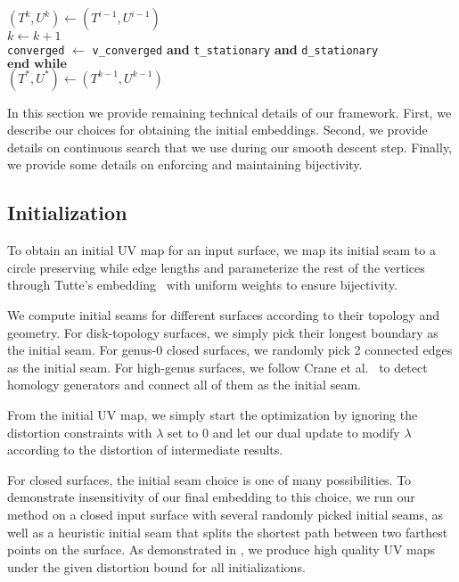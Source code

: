\begin{algorithm}[h!]
\hspace{10pt}  $(T^{k},U^{k}) \leftarrow (T^{i-1},U^{i-1})$ \\

\hspace{10pt} $k \leftarrow k + 1$ \\

\hspace{10pt} \texttt{converged} $\leftarrow$ \texttt{v\_converged} \textbf{and}   \texttt{t\_stationary}  \textbf{and} \texttt{d\_stationary} \\

 $\textbf{end while}$ \\
 
 $(T^{*},U^{*}) \leftarrow (T^{k-1},U^{k-1})$

\end{algorithm}


In this section we provide remaining technical details of our framework. First, we describe our choices for obtaining the initial embeddings. Second, we provide details on continuous search that we use during our smooth descent step. Finally, we provide some details on enforcing and maintaining bijectivity. 

\subsection{Initialization}
To obtain an initial UV map for an input surface, we map its initial seam to a circle preserving while edge lengths and parameterize the rest of the vertices through Tutte's embedding~ with uniform weights to ensure bijectivity.

We compute initial seams for different surfaces according to their topology and geometry. For disk-topology surfaces, we simply pick their longest boundary as the initial seam. For genus-0 closed surfaces, we randomly pick 2 connected edges as the initial seam. For high-genus surfaces, we follow Crane et al.~ to detect homology generators and connect all of them as the initial seam.

From the initial UV map, we simply start the optimization by ignoring the distortion constraints with $\lambda$ set to $0$ and let our dual update to modify $\lambda$ according to the distortion of intermediate results.

For closed surfaces, the initial seam choice is one of many possibilities. To demonstrate insensitivity of our final embedding to this choice, %
we run our method on a closed input surface with several randomly picked initial seams, as well as a heuristic initial seam that splits the shortest path between two farthest points on the surface. As demonstrated in , we produce high quality UV maps under the given distortion bound for all initializations.

